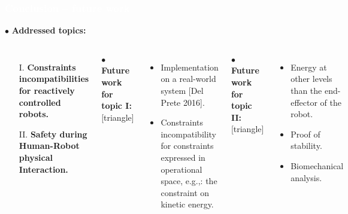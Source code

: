 \begin{frame}[noframenumbering]
\frametitle{{\textcolor{white}{\hspace{0.3cm}Conclusion -- future work}}}
\hspace{-6mm}
$\bullet$ {\color{blue-violet}\textbf{Addressed topics:}}
\begin{columns}
\column{\paperwidth-10mm}
\begin{itemize}
\item[I.]  {\color{red}\textbf{Constraints incompatibilities for reactively controlled robots.}}
\item[II.] {\color{red}\textbf{Safety during Human-Robot physical Interaction.}}
\end{itemize}
\vspace{3mm}
$\bullet$ {\color{ao(english)}\textbf{Future work for topic I:}}
[triangle] 
\begin{itemize}
\item Implementation on a real-world system [Del Prete 2016].
\item Constraints incompatibility for constraints expressed in operational space, e.g.,: the constraint on kinetic energy.
\end{itemize}
\vspace{5mm}
$\bullet$ {\color{ao(english)}\textbf{Future work for topic II:}}
[triangle] 
\begin{itemize}
\item Energy at other levels than the end-effector of the robot.
\item Proof of stability.
\item Biomechanical analysis.
\end{itemize}
\end{columns}
\end{frame}







